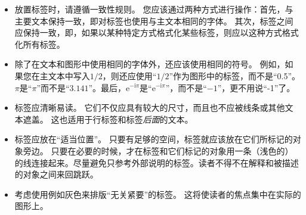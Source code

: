 %
\begin{itemize}
    \item 放置标签时，请遵循一致性规则。 您应该通过两种方式进行操作：首先，与主要文本保持一致，即对标签也使用与主文本相同的字体。 其次，标签之间应保持一致，即，如果以某种特定方式格式化某些标签，则应以这种方式格式化所有标签。
    \item 除了在文本和图形中使用相同的字体外，还应该使用相同的符号。 例如，如果您在主文本中写入$1/2$，则还应使用``$1/2$''作为图形中的标签，而不是``0.5''。$\pi$是``$\pi $''而不是``$3.141$''。最后，$\mathrm e^{-\mathrm i \pi}$是``$\mathrm e^{-\mathrm i \pi}$''，而不是``$-1$''，更不用说``-1''了。
    \item 标签应清晰易读。 它们不仅应具有较大的尺寸，而且也不应被线条或其他文本遮盖。 这也适用于行标签和标签\emph{后面}的文本。
    \item 标签应放在``适当位置''。 只要有足够的空间，标签就应该放在它们所标记的对象旁边。 只要在必要的时候，才在标签和它们标记的对象用一条（浅色的）的线连接起来。尽量避免只参考外部说明的标签。读者不得不在解释和被描述的对象之间来回跳跃。
    \item 考虑使用例如灰色来排版``无关紧要''的标签。 这将使读者的焦点集中在实际的图形上。
\end{itemize}


